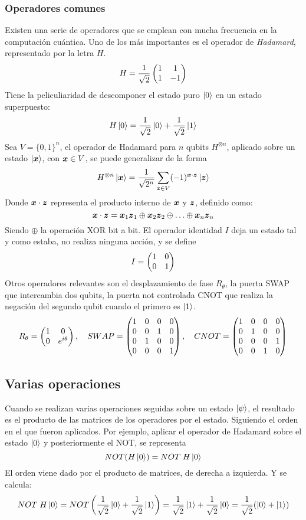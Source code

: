 \subsubsection{Operadores comunes}

Existen una serie de operadores que se emplean con mucha frecuencia en la 
computación cuántica. Uno de los más importantes es el operador de 
\textit{Hadamard}, representado por la letra $H$.
%
$$ H = \frac{1}{\sqrt 2} \begin{pmatrix} 1 & 1 \\ 1 & -1 \end{pmatrix} $$
%
Tiene la peliculiaridad de descomponer el estado puro $\ket{0}$ en un estado 
superpuesto:
%
$$ H \ket{0} = \frac{1}{\sqrt 2}\ket{0} + \frac{1}{\sqrt 2}\ket{1} $$
%
%
Sea $V =  \{0,1\}^n$, el operador de Hadamard para $n$ qubits $H^{\otimes n}$, 
aplicado sobre un estado $\ket{\boldsymbol{x}}$, con $\boldsymbol{x} \in V$, se puede generalizar de 
la forma
%
$$ H^{\otimes n} \ket{\boldsymbol{x}} = \frac 1 {\sqrt {2^n}} \sum_{\boldsymbol{z} \in V} (-1)^{\boldsymbol{x} 
\cdot \boldsymbol{z}} \ket{\boldsymbol{z}}$$
%
Donde $ \boldsymbol{x} \cdot  \boldsymbol{z}$ representa el producto interno de $\boldsymbol{x}$ y $\boldsymbol{z}$, 
definido como:
$$ \boldsymbol{x} \cdot \boldsymbol{z} = \boldsymbol{x}_1 \boldsymbol{z}_1 \oplus \boldsymbol{x}_2 \boldsymbol{z}_2 \oplus \ldots \oplus \boldsymbol{x}_n \boldsymbol{z}_n$$
%
Siendo $\oplus$ la operación XOR bit a bit. El operador identidad $I$ deja un 
estado tal y como estaba, no realiza ninguna acción, y se define
%
$$ I = \begin{pmatrix} 1&0 \\ 0&1 \end{pmatrix}$$
%
Otros operadores relevantes son el desplazamiento de fase $R_\theta$, la puerta 
SWAP que intercambia dos qubits, la puerta not controlada CNOT que realiza la 
negación del segundo qubit cuando el primero es $\ket{1}$.
$$ R_\theta = \begin{pmatrix} 1 & 0 \\ 0 & e^{i\theta} \end{pmatrix}, \quad
SWAP = \begin{pmatrix} 1&0&0&0 \\ 0&0&1&0 \\ 0&1&0&0 \\ 0&0&0&1 \end{pmatrix}, \quad
CNOT = \begin{pmatrix} 1&0&0&0 \\ 0&1&0&0 \\ 0&0&0&1 \\ 0&0&1&0 \end{pmatrix}
$$


\subsection{Varias operaciones}

Cuando se realizan varias operaciones seguidas sobre un estado $\ket{\psi}$, el 
resultado es el producto de las matrices de los operadores por el estado.  
Siguiendo el orden en el que fueron aplicados. Por ejemplo, aplicar el operador 
de Hadamard sobre el estado $\ket{0}$ y posteriormente el NOT, se representa
%
$$ NOT(H\ket{0}) = NOT\; H \ket{0} $$
%
El orden viene dado por el producto de matrices, de derecha a izquierda. Y se 
calcula:
%
$$ NOT\; H \ket{0} = NOT\left(\frac{1}{\sqrt 2}\ket{0} + \frac{1}{\sqrt 
2}\ket{1}\right) =
\frac{1}{\sqrt 2}\ket{1} + \frac{1}{\sqrt 2}\ket{0} = \frac{1}{\sqrt 2}(\ket{0} 
+ \ket{1}) $$

